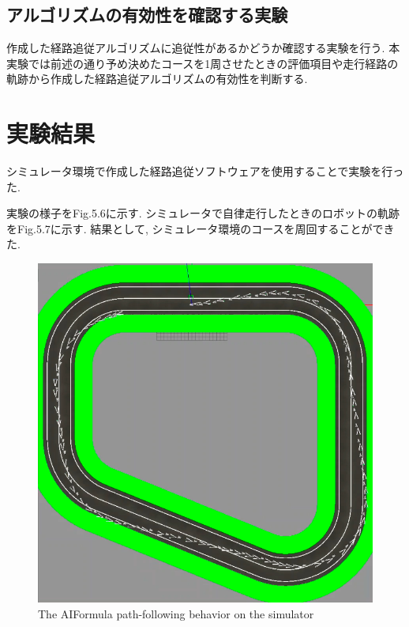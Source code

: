 \subsection{アルゴリズムの有効性を確認する実験}
作成した経路追従アルゴリズムに追従性があるかどうか確認する実験を行う.
本実験では前述の通り予め決めたコースを1周させたときの評価項目や走行経路の軌跡から作成した経路追従アルゴリズムの有効性を判断する.

\section{実験結果}
シミュレータ環境で作成した経路追従ソフトウェアを使用することで実験を行った.

実験の様子をFig.5.6に示す.
シミュレータで自律走行したときのロボットの軌跡をFig.5.7に示す.
結果として, シミュレータ環境のコースを周回することができた.

\begin{figure}[H]
  \centering
 \includegraphics[keepaspectratio, scale=0.5]
      {images/simulatorfollowerpath.png}
 \caption{The AIFormula path-following behavior on the simulator}
 \label{fig:simulatorpath}
\end{figure}